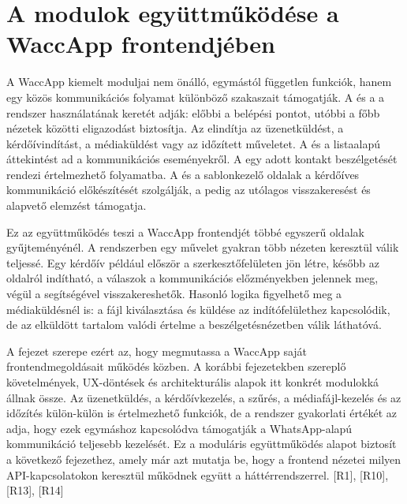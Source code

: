 \section{A modulok együttműködése a WaccApp frontendjében}

A WaccApp kiemelt moduljai nem önálló, egymástól független funkciók, hanem egy közös kommunikációs folyamat különböző szakaszait támogatják. A  és a  a rendszer használatának keretét adják: előbbi a belépési pontot, utóbbi a főbb nézetek közötti eligazodást biztosítja. Az  elindítja az üzenetküldést, a kérdőívindítást, a médiaküldést vagy az időzített műveletet. A  és a  listaalapú áttekintést ad a kommunikációs eseményekről. A  egy adott kontakt beszélgetését rendezi értelmezhető folyamatba. A  és a sablonkezelő oldalak a kérdőíves kommunikáció előkészítését szolgálják, a  pedig az utólagos visszakeresést és alapvető elemzést támogatja. 

Ez az együttműködés teszi a WaccApp frontendjét többé egyszerű oldalak gyűjteményénél. A rendszerben egy művelet gyakran több nézeten keresztül válik teljessé. Egy kérdőív például először a szerkesztőfelületen jön létre, később az  oldalról indítható, a válaszok a kommunikációs előzményekben jelennek meg, végül a  segítségével visszakereshetők. Hasonló logika figyelhető meg a médiaküldésnél is: a fájl kiválasztása és küldése az indítófelülethez kapcsolódik, de az elküldött tartalom valódi értelme a beszélgetésnézetben válik láthatóvá. 

A fejezet szerepe ezért az, hogy megmutassa a WaccApp saját frontendmegoldásait működés közben. A korábbi fejezetekben szereplő követelmények, UX-döntések és architekturális alapok itt konkrét modulokká állnak össze. Az üzenetküldés, a kérdőívkezelés, a szűrés, a médiafájl-kezelés és az időzítés külön-külön is értelmezhető funkciók, de a rendszer gyakorlati értékét az adja, hogy ezek egymáshoz kapcsolódva támogatják a WhatsApp-alapú kommunikáció teljesebb kezelését. Ez a moduláris együttműködés alapot biztosít a következő fejezethez, amely már azt mutatja be, hogy a frontend nézetei milyen API-kapcsolatokon keresztül működnek együtt a háttérrendszerrel. [R1], [R10], [R13], [R14] 
